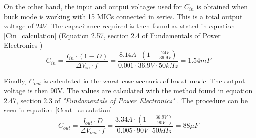 On the other hand, the input and output voltages used for $C_{in}$ is obtained when buck mode is working with 15 MICs connected in series. This is a total output voltage of $24 V$.
The capacitance required is then found as stated in equation \ref{Cin_calculation} (Equation 2.57, section 2.4 of Fundamentals of Power Electronics \cite{Erickson})
\begin{equation} \label{Cin_calculation}
C_{in} = \frac{I_{in} \cdot (1 - D)}{\Delta V_{in} \cdot f} = \frac{8.14 A \cdot ( 1 - \frac{24 V}{36.9 V})}{0.001 \cdot 36.9 V \cdot 50 kHz} = 1.54 mF
\end{equation}

Finally, $C_{out}$ is calculated in the worst case scenario of boost mode. The output voltage is then 90V. The values are calculated with the method found in equation 2.47, section 2.3 of \textit{"Fundamentals of Power Electronics"} \cite{Erickson}. The procedure can be seen in equation \ref{Cout_calculation}
\begin{equation} \label{Cout_calculation}
C_{out} = \frac{I_{out} \cdot D}{\Delta V_{out} \cdot f} = \frac{3.34 A \cdot ( 1 - \frac{36.9 V}{90 V})}{0.005 \cdot 90 V \cdot 50 kHz} = 88 \mu F
\end{equation}
   
